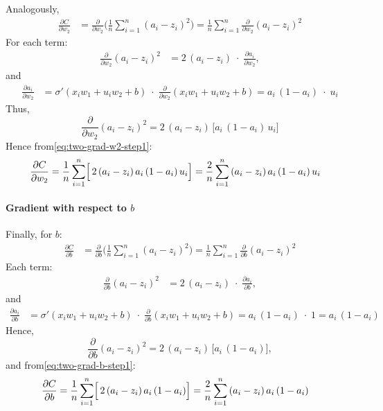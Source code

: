 \documentclass{article}
\begin{document}
\noindent Analogously,
\begin{align}
    \frac{\partial C}{\partial w_2}
    &= \frac{\partial}{\partial w_2} \biggl(\frac{1}{n}\sum_{i=1}^{n}{(a_i - z_i)}^2\biggr)
    = \frac{1}{n} \sum_{i=1}^{n} \frac{\partial}{\partial w_2}{(a_i - z_i)}^2
    \label{eq:two-grad-w2-step1}
\end{align}
For each term:
\begin{align}
    \frac{\partial}{\partial w_2} {(a_i - z_i)}^2
    &= 2\,{(a_i - z_i)}\;\cdot\;\frac{\partial a_i}{\partial w_2},
    \label{eq:two-grad-w2-step2}
\end{align}
and
\begin{align}
    \frac{\partial a_i}{\partial w_2}
    &= \sigma'(x_i w_1 + u_i w_2 + b)\;\cdot\;\frac{\partial}{\partial w_2}(x_i w_1 + u_i w_2 + b)
    = a_i\,(1 - a_i)\;\cdot\; u_i
    \label{eq:two-grad-w2-step3}
\end{align}
Thus,
\[
    \frac{\partial}{\partial w_2}{(a_i - z_i)}^2
    = 2\,{(a_i - z_i)}\,\bigl[a_i\,(1 - a_i)\,u_i\bigr]
\]
Hence from\eqref{eq:two-grad-w2-step1}:
\begin{align}
    \frac{\partial C}{\partial w_2}
    &= \frac{1}{n} \sum_{i=1}^{n} \Bigl[\,2\,{(a_i - z_i)}\,a_i\,(1 - a_i)\,u_i\Bigr]
    = \frac{2}{n} \sum_{i=1}^{n} {(a_i - z_i)}\,a_i\,(1 - a_i)\,u_i
    \label{eq:two-grad-w2-final}
\end{align}

\paragraph{Gradient with respect to \(b\)\\}\label{sec:grad-b-two-input}

\noindent Finally, for \(b\):
\begin{align}
    \frac{\partial C}{\partial b}
    &= \frac{\partial}{\partial b} \biggl(\frac{1}{n}\sum_{i=1}^{n}{(a_i - z_i)}^2\biggr)
    = \frac{1}{n} \sum_{i=1}^{n} \frac{\partial}{\partial b}{(a_i - z_i)}^2
    \label{eq:two-grad-b-step1}
\end{align}
Each term:
\begin{align}
    \frac{\partial}{\partial b} {(a_i - z_i)}^2
    &= 2\,{(a_i - z_i)}\;\cdot\;\frac{\partial a_i}{\partial b},
    \label{eq:two-grad-b-step2}
\end{align}
and
\begin{align}
    \frac{\partial a_i}{\partial b}
    &= \sigma'(x_i w_1 + u_i w_2 + b)\;\cdot\;\frac{\partial}{\partial b}(x_i w_1 + u_i w_2 + b)
    = a_i\,(1 - a_i)\;\cdot\;1
    = a_i\,(1 - a_i)
    \label{eq:two-grad-b-step3}
\end{align}
Hence,
\[
    \frac{\partial}{\partial b} {(a_i - z_i)}^2
    = 2\,{(a_i - z_i)}\,\bigl[a_i\,(1 - a_i)\bigr],
\]
and from\eqref{eq:two-grad-b-step1}:
\begin{align}
    \frac{\partial C}{\partial b}
    &= \frac{1}{n} \sum_{i=1}^{n} \Bigl[\,2\,{(a_i - z_i)}\,a_i\,(1 - a_i)\Bigr]
    = \frac{2}{n} \sum_{i=1}^{n} {(a_i - z_i)}\,a_i\,(1 - a_i)
    \label{eq:two-grad-b-final}
\end{align}
\end{document}
